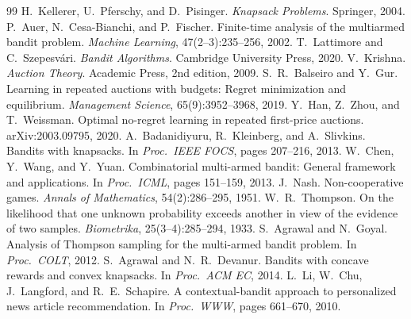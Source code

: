 \documentclass{article}
\theoremstyle{definition}
\begin{document}
\small
\begin{thebibliography}{99}
\setlength{\itemsep}{0pt}
 H.~Kellerer, U.~Pferschy, and D.~Pisinger. \emph{Knapsack Problems}. Springer, 2004.
 P.~Auer, N.~Cesa-Bianchi, and P.~Fischer. Finite-time analysis of the multiarmed bandit problem. \emph{Machine Learning}, 47(2--3):235--256, 2002.
 T.~Lattimore and C.~Szepesv{\'a}ri. \emph{Bandit Algorithms}. Cambridge University Press, 2020.
 V.~Krishna. \emph{Auction Theory}. Academic Press, 2nd edition, 2009.
 S.~R.~Balseiro and Y.~Gur. Learning in repeated auctions with budgets: Regret minimization and equilibrium. \emph{Management Science}, 65(9):3952--3968, 2019.
 Y.~Han, Z.~Zhou, and T.~Weissman. Optimal no-regret learning in repeated first-price auctions. arXiv:2003.09795, 2020.
 A.~Badanidiyuru, R.~Kleinberg, and A.~Slivkins. Bandits with knapsacks. In \emph{Proc.\ IEEE FOCS}, pages 207--216, 2013.
 W.~Chen, Y.~Wang, and Y.~Yuan. Combinatorial multi-armed bandit: General framework and applications. In \emph{Proc.\ ICML}, pages 151--159, 2013.
 J.~Nash. Non-cooperative games. \emph{Annals of Mathematics}, 54(2):286--295, 1951.
 W.~R.~Thompson. On the likelihood that one unknown probability exceeds another in view of the evidence of two samples. \emph{Biometrika}, 25(3--4):285--294, 1933.
 S.~Agrawal and N.~Goyal. Analysis of {T}hompson sampling for the multi-armed bandit problem. In \emph{Proc.\ COLT}, 2012.
 S.~Agrawal and N.~R.~Devanur. Bandits with concave rewards and convex knapsacks. In \emph{Proc.\ ACM EC}, 2014.
 L.~Li, W.~Chu, J.~Langford, and R.~E.~Schapire. A contextual-bandit approach to personalized news article recommendation. In \emph{Proc.\ WWW}, pages 661--670, 2010.
\end{thebibliography}
\end{document}

